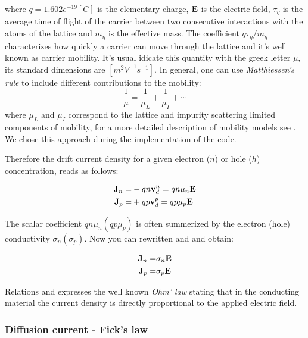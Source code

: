 where $q=1.602e^{-19}[C]$ is the elementary charge, $\mathbf{E}$ is the electric field, $\tau_\eta$ is the average time of flight of the carrier between two consecutive interactions with the atoms of the lattice and $m_\eta$ is the effective mass.
The coefficient $q\tau_\eta / m_\eta$ characterizes how quickly a carrier can move through the lattice and it's well known as carrier mobility. It's usual idicate this quantity with the greek letter $\mu$, its standard dimensions are $[m^2V^{-1}s^{-1}]$.
In general, one can use \textit{Matthiessen's rule} to include different contributions to the mobility:
\begin{equation}
\dfrac{1}{\mu} = \dfrac{1}{\mu_L} + \dfrac{1}{\mu_I} + \cdots
\end{equation}
where $\mu_L$ and $\mu_I$ correspond to the lattice and impurity scattering limited components of mobility, for a more detailed description of mobility models see \cite{ModernVLSIdevices}. We chose this approach during the implementation of the code.

Therefore the drift current density for a given electron ($n$) or hole ($h$) concentration, reads as follows:

\begin{align}
\mathbf{J}_n =& -qn\mathbf{v}_d^n = qn\mu_n\mathbf{E}  \label{eq: drift electron}\\ 
\mathbf{J}_p =& +qp\mathbf{v}_d^p = qp\mu_p\mathbf{E} \label{eq: drift hole}
\end{align}

The scalar coefficient $qn\mu_n(qp\mu_p)$ is often summerized by the electron (hole) conductivity $\sigma_n(\sigma_p)$. Now you can rewritten  and  and obtain:

\begin{align}
\mathbf{J}_n =&\sigma_n\mathbf{E}  \label{eq: ohm drift electron}\\ 
\mathbf{J}_p =& \sigma_p\mathbf{E} \label{eq: ohm drift hole}
\end{align}

Relations  and  expresses the well known \textit{Ohm' law} stating that in the conducting material  the current density is directly proportional to the applied electric field.


\subsubsection{Diffusion current - Fick's law}

